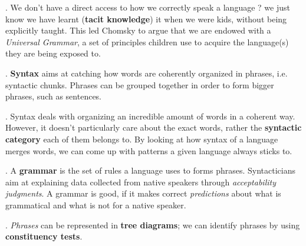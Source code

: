 \documentclass[11pt, oneside]{article}   	%
\begin{document}
\ex. We don't have a direct access to how we correctly speak a language ? we just know we have learnt ({\bfseries tacit knowledge}) it when we were kids, without being explicitly taught. This led Chomsky to argue that we are endowed with a {\em Universal Grammar}, a set of principles children use to acquire the language(s) they are being exposed to.

\ex. {\bfseries Syntax} aims at catching how words are coherently organized in phrases, i.e. syntactic chunks. Phrases can be grouped together in order to form bigger phrases, such as sentences.

\ex. Syntax deals with organizing an incredible amount of words in a coherent way. However, it doesn't particularly care about the exact words, rather the {\bfseries syntactic category} each of them belongs to. By looking at how syntax of a language merges words, we can come up with patterns a given language always sticks to.

\ex. A {\bfseries grammar} is the set of rules a language uses to forms phrases. Syntacticians aim at explaining data collected from native speakers through {\em acceptability judgments}. A grammar is good, if it makes correct {\em predictions} about what is grammatical and what is not for a native speaker. 

\ex. {\em Phrases} can be represented in {\bfseries tree diagrams}; we can identify phrases by using {\bfseries constituency tests}.

\end{document}
